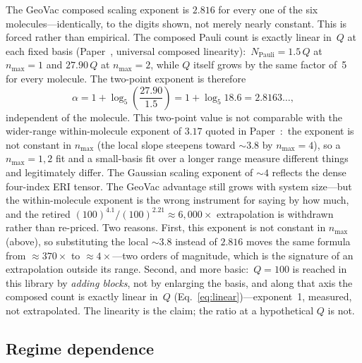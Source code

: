 \documentclass[twocolumn,pra,amsmath,amssymb,superscriptaddress]{revtex4-2}
\begin{document}
The GeoVac composed scaling exponent is $2.816$ for every one of the
six molecules---identically, to the digits shown, not merely nearly
constant.  This is forced rather than empirical.  The composed Pauli
count is exactly linear in~$Q$ at each fixed basis
(Paper~\cite{GeoVac_Paper14}, universal composed linearity):\ $N_{\mathrm{Pauli}} = 1.5\,Q$ at
$n_{\max}=1$ and $27.90\,Q$ at $n_{\max}=2$, while $Q$ itself grows by
the same factor of~5 for every molecule.  The two-point exponent is
therefore
\begin{equation}
  \alpha = 1 + \log_5\!\left(\frac{27.90}{1.5}\right)
         = 1 + \log_5 18.6 = 2.8163\ldots,
  \label{eq:alpha_exact}
\end{equation}
independent of the molecule.  This two-point value is not comparable with
the wider-range within-molecule exponent of $3.17$ quoted in
Paper~\cite{GeoVac_Paper14}:\ the exponent is not constant in $n_{\max}$
(the local slope steepens toward $\sim\!3.8$ by $n_{\max}=4$), so a
$n_{\max}=1,2$ fit and a small-basis fit over a longer range measure
different things and legitimately differ.  The Gaussian scaling exponent of
$\sim 4$ reflects the dense four-index ERI tensor.  The GeoVac advantage still
grows with system size---but the within-molecule exponent is the wrong
instrument for saying by how much, and the retired
$(100)^{4.1}/(100)^{2.21} \approx 6{,}000\times$ extrapolation is
withdrawn rather than re-priced.  Two reasons.  First, this exponent is
not constant in $n_{\max}$ (above), so substituting the local
$\sim\!3.8$ instead of $2.816$ moves the same formula from
$\approx 370\times$ to $\approx 4\times$---two orders of magnitude, which
is the signature of an extrapolation outside its range.  Second, and more
basic:\ $Q = 100$ is reached in this library by \emph{adding blocks}, not
by enlarging the basis, and along that axis the composed count is exactly
linear in~$Q$ (Eq.~\ref{eq:linear})---exponent~1, measured, not
extrapolated.  The linearity is the claim; the ratio at a hypothetical
$Q$ is not.

\subsection{Regime dependence}
\end{document}
